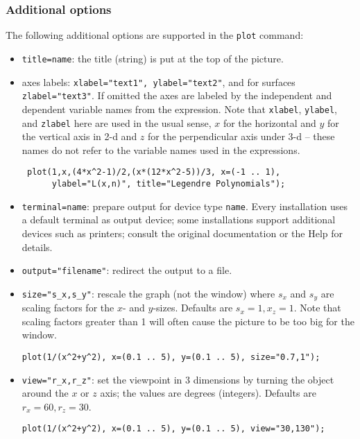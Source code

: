 \subsubsection{Additional options}

The following additional {\Gnuplot} options are supported in the \texttt{plot} command:
\begin{itemize}
  \item \texttt{title=name}: the title (string) is put at the top of the picture.
  \item axes labels: \texttt{xlabel="text1", ylabel="text2"}, and for surfaces
    \texttt{zlabel="text3"}. If omitted the axes are labeled by the independent
    and dependent variable names from the expression. Note that \texttt{xlabel},
    \texttt{ylabel}, and \texttt{zlabel} here are used in the usual sense, $x$
    for the horizontal and $y$ for the vertical axis in 2-d and $z$ for the
    perpendicular axis under 3-d -- these names do not refer to the variable
    names used in the expressions.
 \begin{verbatim}
 plot(1,x,(4*x^2-1)/2,(x*(12*x^2-5))/3, x=(-1 .. 1),
      ylabel="L(x,n)", title="Legendre Polynomials");
 \end{verbatim}
  \item \texttt{terminal=name}: prepare output for device type \texttt{name}.
    Every installation uses a default terminal as output device; some
    installations support additional devices such as printers; consult the
    original {\Gnuplot} documentation or the {\Gnuplot} Help for details.
  \item \texttt{output="filename"}: redirect the output to a file.
  \item \texttt{size="s\_x,s\_y"}: rescale the graph (not the window) where
    $s_x$ and $s_y$ are scaling factors for the $x$- and $y$-sizes.  Defaults
    are $s_x=1,x_z=1$.  Note that scaling factors greater than 1 will often
    cause the picture to be too big for the window.
\begin{verbatim}
plot(1/(x^2+y^2), x=(0.1 .. 5), y=(0.1 .. 5), size="0.7,1");
\end{verbatim}
  \item \texttt{view="r\_x,r\_z"}: set the viewpoint in 3 dimensions by turning
    the object around the $x$ or $z$ axis; the values are degrees (integers).
    Defaults are $r_x=60,r_z=30$.
\begin{verbatim}
plot(1/(x^2+y^2), x=(0.1 .. 5), y=(0.1 .. 5), view="30,130");
\end{verbatim}

\end{itemize}
